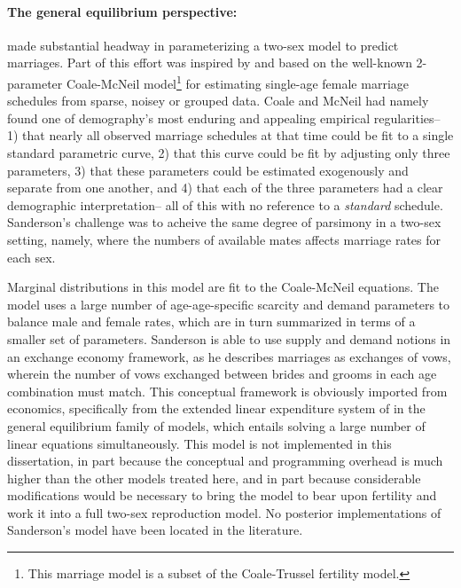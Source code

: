 \paragraph{The general equilibrium perspective: } \citet{marriage1981warren,
sanderson1983two} made substantial headway in parameterizing a two-sex model to predict marriages. Part of this effort was
inspired by and based on the well-known 2-parameter Coale-McNeil
model\citep{coale1972distribution, coale1971age}\footnote{This marriage model is
a subset of the Coale-Trussel fertility model.} for estimating
single-age female marriage schedules from sparse, noisey or grouped
data. Coale and McNeil had namely found one of demography's most enduring 
and appealing empirical regularities-- 1) that nearly 
all observed marriage schedules at that time could be fit to a single standard parametric
curve, 2) that this curve could be fit by adjusting only three parameters, 3)
that these parameters could be estimated exogenously and separate from one
another, and 4) that each of the three parameters had a clear demographic
interpretation-- all of this with no reference to a \textit{standard}
schedule. Sanderson's challenge was to acheive the same degree of parsimony in a
two-sex setting, namely, where the numbers of available mates affects marriage
rates for each sex. 

Marginal distributions in this model are fit to the
Coale-McNeil equations. The model uses a large number of
age-age-specific scarcity and demand parameters to balance male and female
rates, which are in turn summarized in terms of a smaller set of parameters.
Sanderson is able to use supply and demand notions in an exchange economy
framework, as he describes marriages as exchanges of vows, wherein the number
of vows exchanged between brides and grooms in each age combination must
match. This conceptual framework is obviously imported from economics,
specifically from the extended linear expenditure system of
\citet{lluch1977patterns} in the general equilibrium family of models, which entails solving a large number of linear
equations simultaneously. This model is not implemented in this dissertation, 
in part because the conceptual and programming overhead is much higher
than the other models treated here, and in part because considerable
modifications would be necessary to bring the model to bear upon fertility and
work it into a full two-sex reproduction model. No posterior implementations of
Sanderson's model have been located in the literature.

